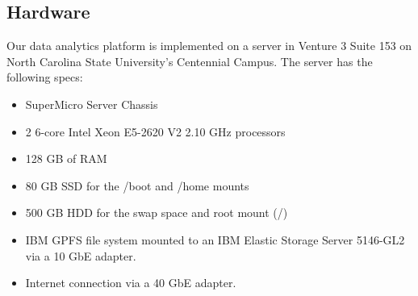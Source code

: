 \subsection{Hardware}
\label{sec:hardware}

Our data analytics platform is implemented on a server in Venture 3
Suite 153 on North Carolina State University's Centennial Campus. The
server has the following specs:
\begin{itemize}
  \item SuperMicro Server Chassis
  \item 2 6-core Intel Xeon E5-2620 V2 2.10 GHz processors
  \item 128 GB of RAM
  \item 80 GB SSD for the /boot and /home mounts
  \item 500 GB HDD for the swap space and root mount (/)
  \item IBM GPFS file system mounted to an IBM Elastic Storage Server
5146-GL2 via a 10 GbE adapter.
  \item Internet connection via a 40 GbE adapter.
\end{itemize}
